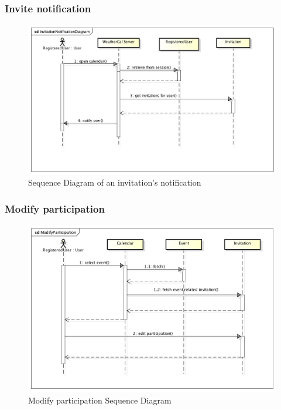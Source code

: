 \subsubsection{Invite notification}
\begin{center}
 \begin{figure}[H]
    \includegraphics[width=1\textwidth,height=1\textwidth]{../UMLDiagram/sequence/InvitationNotificationDiagram/InvitationNotificationDiagram.png}
    \caption{Sequence Diagram of an invitation's notification}
     \label{fig:notseqdiagr}
     \end{figure}
   \end{center}  
\subsubsection{Modify participation}
\begin{center}
 \begin{figure}[H]
    \includegraphics[width=1\textwidth]{../UMLDiagram/sequence/ModifyParticipation/ModifyParticipation.png}
    \caption{Modify participation Sequence Diagram}
     \label{fig:modpartseqdiag}
     \end{figure}
   \end{center}  
